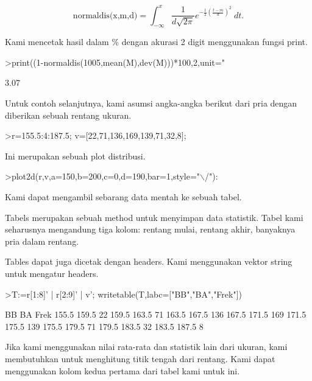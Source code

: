 \documentclass[a4paper,10pt]{article}
\begin{document}
\begin{eulernotebook}
\begin{eulercomment}
\end{eulercomment}
\begin{eulerformula}
\[
\text{normaldis(x,m,d)}=\int_{-\infty}^x \frac{1}{d\sqrt{2\pi}}e^{-\frac{1}{2}(\frac{t-m}{d})^2}\ dt.
\]
\end{eulerformula}
\begin{eulercomment}
Kami mencetak hasil dalam \% dengan akurasi 2 digit menggunakan fungsi print.
\end{eulercomment}
\begin{eulerprompt}
>print((1-normaldis(1005,mean(M),dev(M)))*100,2,unit=" %
\end{eulerprompt}
\begin{euleroutput}
        3.07 %
\end{euleroutput}
\begin{eulercomment}
Untuk contoh selanjutnya, kami asumsi angka-angka berikut dari pria dengan diberikan
sebuah rentang ukuran.
\end{eulercomment}
\begin{eulerprompt}
>r=155.5:4:187.5; v=[22,71,136,169,139,71,32,8];
\end{eulerprompt}
\begin{eulercomment}
Ini merupakan sebuah plot distribusi.
\end{eulercomment}
\begin{eulerprompt}
>plot2d(r,v,a=150,b=200,c=0,d=190,bar=1,style="\(\backslash\)/"):
\end{eulerprompt}
\begin{eulercomment}
Kami dapat mengambil sebarang data mentah ke sebuah tabel.

Tabels merupakan sebuah method untuk menyimpan data statistik. Tabel kami seharusnya
mengandung tiga kolom: rentang mulai, rentang akhir, banyaknya pria dalam rentang.

Tables dapat juga dicetak dengan headers. Kami menggunakan vektor string untuk mengatur
headers.
\end{eulercomment}
\begin{eulerprompt}
>T:=r[1:8]' | r[2:9]' | v'; writetable(T,labc=["BB","BA","Frek"])
\end{eulerprompt}
\begin{euleroutput}
          BB        BA      Frek
       155.5     159.5        22
       159.5     163.5        71
       163.5     167.5       136
       167.5     171.5       169
       171.5     175.5       139
       175.5     179.5        71
       179.5     183.5        32
       183.5     187.5         8
\end{euleroutput}
\begin{eulercomment}
Jika kami menggunakan nilai rata-rata dan statistik lain dari ukuran, kami membutuhkan
untuk menghitung titik tengah dari rentang. Kami dapat menggunakan kolom kedua pertama
dari tabel kami untuk ini.


\end{eulercomment}
\end{eulernotebook}
\end{document}
